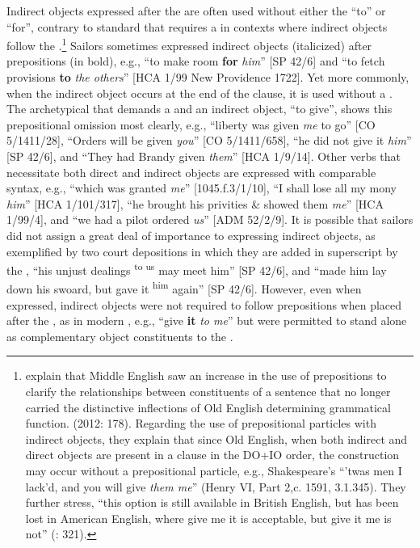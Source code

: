 Indirect objects expressed after the  are often used without either the  “to” or “for”, contrary to standard  that requires a  in contexts where indirect objects follow the .\footnote{\citeauthor{MillwardHayes2012} explain that Middle English saw an increase in the use of prepositions to clarify the relationships between constituents of a sentence that no longer carried the distinctive inflections of Old English determining grammatical function. (2012: 178). Regarding the use of prepositional particles with indirect objects, they explain that since Old English, when both indirect and direct objects are present in a clause in the DO+IO order, the construction may occur without a prepositional particle, e.g., Shakespeare’s “’twas men I lack’d, and you will give \textit{them me}” (Henry VI, Part 2,c. 1591, 3.1.345). They further stress, “this option is still available in British English, but has been lost in American English, where give me it is acceptable, but give it me is not” (\citealt{MillwardHayes2012}: 321).} Sailors sometimes expressed indirect objects (italicized) after prepositions (in bold), e.g., “to make room \textbf{for} \textit{him}” [SP 42/6] and “to fetch provisions \textbf{to} \textit{the others}” [HCA 1/99 New Providence 1722]. Yet more commonly, when the indirect object occurs at the end of the clause, it is used without a . The archetypical  that demands a  and an indirect object, “to give”, shows this prepositional omission most clearly, e.g., “liberty was given \textit{me} to go” [CO 5/1411/28], “Orders will be given \textit{you}” [CO 5/1411/658], “he did not give it \textit{him}” [SP 42/6], and “They had Brandy given \textit{them}” [HCA 1/9/14]. Other verbs that necessitate both direct and indirect objects are expressed with comparable syntax, e.g., “which was granted \textit{me}” [1045.f.3/1/10], “I shall lose all my mony \textit{him}” [HCA 1/101/317], “he brought his privities \& showed them \textit{me}” [HCA 1/99/4], and “we had a pilot ordered \textit{us}” [ADM 52/2/9]. It is possible that sailors did not assign a great deal of importance to expressing indirect objects, as exemplified by two court depositions in which they are added in superscript by the , “his unjust dealings \textsuperscript{to us} may meet him” [SP 42/6], and “made him lay down his swoard, but gave it \textsuperscript{him} again” [SP 42/6]. However, even when expressed, indirect objects were not required to follow prepositions when placed after the , as in modern , e.g., “give \textbf{it} \textit{to me}” but were permitted to stand alone as complementary object constituents to the . 

